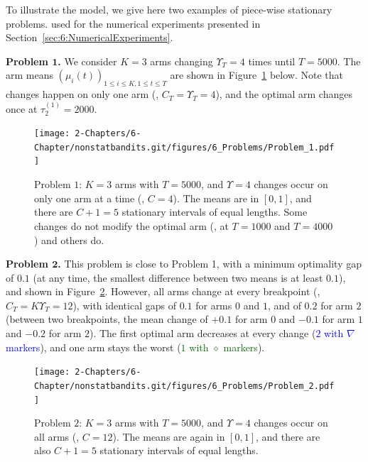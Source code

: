 To illustrate the model, we give here two examples of piece-wise stationary problems.
used for the numerical experiments presented in Section~\ref{sec:6:NumericalExperiments}.

\textbf{Problem $\bm 1$.}
We consider $K=3$ arms changing $\Upsilon_T=4$ times until $T=5000$.
The arm means $(\mu_i(t))_{1\leq i\leq K,1\leq t\leq T}$ are shown in Figure~\ref{fig:6:Problem_1} below.
Note that changes happen on only one arm (\ie, $C_T=\Upsilon_T=4$),
and the optimal arm changes once at $\tau_2^{(1)}=2000$.

\begin{figure}[h!]  %
    \centering
    \texttt{[image: 2-Chapters/6-Chapter/nonstatbandits.git/figures/6\_Problems/Problem\_1.pdf]}
    \caption{Problem $1$: $K=3$ arms with $T=5000$, and $\Upsilon=4$ changes occur on only one arm at a time (\ie, $C=4$).
        The means are in $[0,1]$, and there are $C+1=5$ stationary intervals of equal lengths.
        Some changes do not modify the optimal arm (\eg, at $T=1000$ and $T=4000$) and others do.
    }
    \label{fig:6:Problem_1}
\end{figure}


\textbf{Problem $\bm 2$.}
This problem is close to Problem 1, with a minimum optimality gap of $0.1$ (at any time, the smallest difference between two means is at least $0.1$),
and shown in Figure~\ref{fig:6:Problem_2}.
However, all arms change at every breakpoint (\ie, $C_T=K\Upsilon_T=12$), with identical gaps of $0.1$ for arms $0$ and $1$, and of $0.2$ for arm $2$ (between two breakpoints, the mean change of $+0.1$ for arm $0$ and $-0.1$ for arm $1$ and $-0.2$ for arm $2$).
The first optimal arm decreases at every change (\textcolor{blue}{$2$ with $\nabla$ markers}), and one arm stays the worst (\textcolor{darkgreen}{$1$ with $\diamond$ markers}).

\begin{figure}[h!]  %
    \centering
    \texttt{[image: 2-Chapters/6-Chapter/nonstatbandits.git/figures/6\_Problems/Problem\_2.pdf]}
    \caption{Problem $2$: $K=3$ arms with $T=5000$, and $\Upsilon=4$ changes occur on all arms (\ie, $C=12$).
        The means are again in $[0,1]$, and there are also $C+1=5$ stationary intervals of equal lengths.
    }
    \label{fig:6:Problem_2}
\end{figure}


